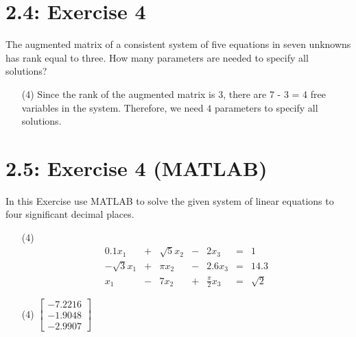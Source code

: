 \documentclass{report}
\begin{document}
\section*{2.4: Exercise 4} 

The augmented matrix of a consistent system of five equations in seven
unknowns has rank equal to three.  How many parameters are needed to
specify all solutions? \\

\sol

\begin{enumerate}
\item[(4)] Since the rank of the augmented matrix is 3, there are 7 - 3 = 4 free variables in the system. Therefore, we need $\boxed{4}$ parameters to specify all solutions.
\end{enumerate}






\section*{2.5: Exercise 4 (MATLAB)} 

In this Exercise use MATLAB to
solve the given system of linear equations to four significant decimal places.

\begin{enumerate}
    \item[(4)]
\[
\begin{array}{rcrcrcr}
     0.1 x_1 & + & \sqrt{5}x_2 & - &   2 x_3 & = & 1 \\
-\sqrt{3}x_1 & + &     \pi x_2 & - & 2.6 x_3 & = & 14.3 \\
         x_1 & - & 7 x_2 & + & \frac{\pi}{2}x_3 & = & \sqrt{2}
\end{array}
\]
    
\end{enumerate}

\sol 

\begin{enumerate}
\item[(4)] $\begin{bmatrix}-7.2216 \\ -1.9048 \\-2.9907 \end{bmatrix}$

\end{enumerate}
\end{document}
